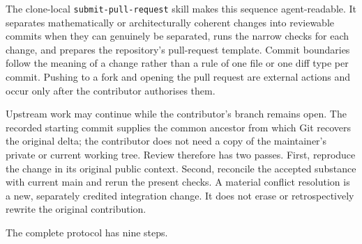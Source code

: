 \documentclass[10pt]{article}
\begin{document}
The clone-local \texttt{submit-pull-request} skill makes this sequence
agent-readable. It separates mathematically or architecturally coherent
changes into reviewable commits when they can genuinely be separated, runs the
narrow checks for each change, and prepares the repository's pull-request
template. Commit boundaries follow the meaning of a change rather than a rule
of one file or one diff type per commit. Pushing to a fork and opening the pull
request are external actions and occur only after the contributor authorises
them.

Upstream work may continue while the contributor's branch remains open. The
recorded starting commit supplies the common ancestor from which Git recovers
the original delta; the contributor does not need a copy of the maintainer's
private or current working tree. Review therefore has two passes. First,
reproduce the change in its original public context. Second, reconcile the
accepted substance with current main and rerun the present checks. A material
conflict resolution is a new, separately credited integration change. It does
not erase or retrospectively rewrite the original contribution.

The complete protocol has nine steps.
\end{document}
